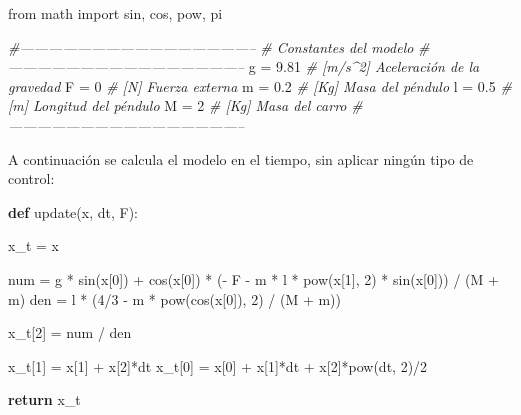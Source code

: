 \documentclass[onecolumn]{article}
\newenvironment{Shaded}{}{}
\newcommand{\BuiltInTok}[1]{#1}
\newcommand{\CommentTok}[1]{\textcolor[rgb]{0.38,0.63,0.69}{\textit{#1}}}
\newcommand{\ControlFlowTok}[1]{\textcolor[rgb]{0.00,0.44,0.13}{\textbf{#1}}}
\newcommand{\DecValTok}[1]{\textcolor[rgb]{0.25,0.63,0.44}{#1}}
\newcommand{\FloatTok}[1]{\textcolor[rgb]{0.25,0.63,0.44}{#1}}
\newcommand{\ImportTok}[1]{#1}
\newcommand{\KeywordTok}[1]{\textcolor[rgb]{0.00,0.44,0.13}{\textbf{#1}}}
\newcommand{\NormalTok}[1]{#1}
\newcommand{\OperatorTok}[1]{\textcolor[rgb]{0.40,0.40,0.40}{#1}}
\begin{document}
\begin{Shaded}
\begin{Highlighting}[]
\ImportTok{from}\NormalTok{ math }\ImportTok{import}\NormalTok{ sin, cos, }\BuiltInTok{pow}\NormalTok{, pi}

\CommentTok{#--------------------------------------------------}
\CommentTok{# Constantes del modelo}
\CommentTok{#--------------------------------------------------}
\NormalTok{g }\OperatorTok{=} \FloatTok{9.81}    \CommentTok{# [m/s^2]   Aceleración de la gravedad}
\NormalTok{F }\OperatorTok{=} \DecValTok{0}       \CommentTok{# [N]       Fuerza externa}
\NormalTok{m }\OperatorTok{=} \FloatTok{0.2}     \CommentTok{# [Kg]      Masa del péndulo}
\NormalTok{l }\OperatorTok{=} \FloatTok{0.5}     \CommentTok{# [m]       Longitud del péndulo}
\NormalTok{M }\OperatorTok{=} \DecValTok{2}       \CommentTok{# [Kg]      Masa del carro}
\CommentTok{#--------------------------------------------------}
\end{Highlighting}
\end{Shaded}

A continuación se calcula el modelo en el tiempo, sin aplicar ningún
tipo de control:

\begin{Shaded}
\begin{Highlighting}[]
\KeywordTok{def}\NormalTok{ update(x, dt, F):}

\NormalTok{    x_t }\OperatorTok{=}\NormalTok{ x}

\NormalTok{    num }\OperatorTok{=}\NormalTok{ g }\OperatorTok{*}\NormalTok{ sin(x[}\DecValTok{0}\NormalTok{]) }\OperatorTok{+}\NormalTok{ cos(x[}\DecValTok{0}\NormalTok{]) }\OperatorTok{*}\NormalTok{ (}\OperatorTok{-}\NormalTok{ F }\OperatorTok{-}\NormalTok{ m }\OperatorTok{*}\NormalTok{ l }\OperatorTok{*} \BuiltInTok{pow}\NormalTok{(x[}\DecValTok{1}\NormalTok{], }\DecValTok{2}\NormalTok{) }\OperatorTok{*}\NormalTok{ sin(x[}\DecValTok{0}\NormalTok{])) }\OperatorTok{/}\NormalTok{ (M }\OperatorTok{+}\NormalTok{ m)}
\NormalTok{    den }\OperatorTok{=}\NormalTok{ l }\OperatorTok{*}\NormalTok{ (}\DecValTok{4}\OperatorTok{/}\DecValTok{3} \OperatorTok{-}\NormalTok{ m }\OperatorTok{*} \BuiltInTok{pow}\NormalTok{(cos(x[}\DecValTok{0}\NormalTok{]), }\DecValTok{2}\NormalTok{) }\OperatorTok{/}\NormalTok{ (M }\OperatorTok{+}\NormalTok{ m))}

\NormalTok{    x_t[}\DecValTok{2}\NormalTok{] }\OperatorTok{=}\NormalTok{ num }\OperatorTok{/}\NormalTok{ den}

\NormalTok{    x_t[}\DecValTok{1}\NormalTok{] }\OperatorTok{=}\NormalTok{ x[}\DecValTok{1}\NormalTok{] }\OperatorTok{+}\NormalTok{ x[}\DecValTok{2}\NormalTok{]}\OperatorTok{*}\NormalTok{dt}
\NormalTok{    x_t[}\DecValTok{0}\NormalTok{] }\OperatorTok{=}\NormalTok{ x[}\DecValTok{0}\NormalTok{] }\OperatorTok{+}\NormalTok{ x[}\DecValTok{1}\NormalTok{]}\OperatorTok{*}\NormalTok{dt }\OperatorTok{+}\NormalTok{ x[}\DecValTok{2}\NormalTok{]}\OperatorTok{*}\BuiltInTok{pow}\NormalTok{(dt, }\DecValTok{2}\NormalTok{)}\OperatorTok{/}\DecValTok{2}

    \ControlFlowTok{return}\NormalTok{ x_t}
\end{Highlighting}
\end{Shaded}
\end{document}
